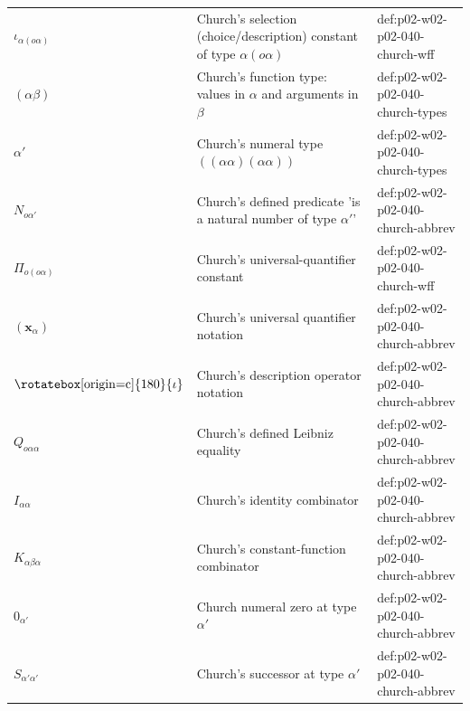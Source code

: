 \begin{longtable}{@{}p{}p{}p{}@{}}
\(\iota_{\alpha(o\alpha)}\) & Church's selection (choice/description) constant of type \(\alpha(o\alpha)\) & def:\allowbreak{}p02-\allowbreak{}w02-\allowbreak{}p02-\allowbreak{}040-\allowbreak{}church-\allowbreak{}wff \\
\((\alpha\beta)\) & Church's function type: values in \(\alpha\) and arguments in \(\beta\) & def:\allowbreak{}p02-\allowbreak{}w02-\allowbreak{}p02-\allowbreak{}040-\allowbreak{}church-\allowbreak{}types \\
\(\alpha'\) & Church's numeral type \(((\alpha\alpha)(\alpha\alpha))\) & def:\allowbreak{}p02-\allowbreak{}w02-\allowbreak{}p02-\allowbreak{}040-\allowbreak{}church-\allowbreak{}types \\
\(N_{o\alpha'}\) & Church's defined predicate 'is a natural number of type \(\alpha'\)' & def:\allowbreak{}p02-\allowbreak{}w02-\allowbreak{}p02-\allowbreak{}040-\allowbreak{}church-\allowbreak{}abbrev \\
\(\Pi_{o(o\alpha)}\) & Church's universal-quantifier constant & def:\allowbreak{}p02-\allowbreak{}w02-\allowbreak{}p02-\allowbreak{}040-\allowbreak{}church-\allowbreak{}wff \\
\((\mathbf x_\alpha)\) & Church's universal quantifier notation & def:\allowbreak{}p02-\allowbreak{}w02-\allowbreak{}p02-\allowbreak{}040-\allowbreak{}church-\allowbreak{}abbrev \\
\(\text{\rotatebox[origin=c]{180}{\ensuremath{\iota}}}\) & Church's description operator notation & def:\allowbreak{}p02-\allowbreak{}w02-\allowbreak{}p02-\allowbreak{}040-\allowbreak{}church-\allowbreak{}abbrev \\
\(Q_{o\alpha\alpha}\) & Church's defined Leibniz equality & def:\allowbreak{}p02-\allowbreak{}w02-\allowbreak{}p02-\allowbreak{}040-\allowbreak{}church-\allowbreak{}abbrev \\
\(I_{\alpha\alpha}\) & Church's identity combinator & def:\allowbreak{}p02-\allowbreak{}w02-\allowbreak{}p02-\allowbreak{}040-\allowbreak{}church-\allowbreak{}abbrev \\
\(K_{\alpha\beta\alpha}\) & Church's constant-function combinator & def:\allowbreak{}p02-\allowbreak{}w02-\allowbreak{}p02-\allowbreak{}040-\allowbreak{}church-\allowbreak{}abbrev \\
\(0_{\alpha'}\) & Church numeral zero at type \(\alpha'\) & def:\allowbreak{}p02-\allowbreak{}w02-\allowbreak{}p02-\allowbreak{}040-\allowbreak{}church-\allowbreak{}abbrev \\
\(S_{\alpha'\alpha'}\) & Church's successor at type \(\alpha'\) & def:\allowbreak{}p02-\allowbreak{}w02-\allowbreak{}p02-\allowbreak{}040-\allowbreak{}church-\allowbreak{}abbrev \\

\end{longtable}
